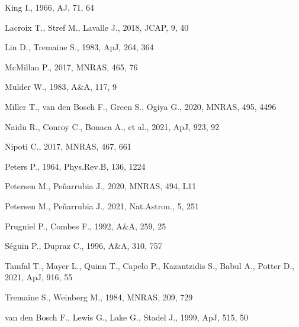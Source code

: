\documentclass[twocolumn]{aastex63}
\begin{document}
\begin{thebibliography}{}
King I., 1966, AJ, 71, 64

Lacroix T., Stref M., Lavalle J., 2018, JCAP, 9, 40

Lin D., Tremaine S., 1983, ApJ, 264, 364

McMillan P., 2017, MNRAS, 465, 76

Mulder W., 1983, A\&A, 117, 9

Miller T., van den Bosch F., Green S., Ogiya G., 2020, MNRAS, 495, 4496

Naidu R., Conroy C., Bonaca A., et al., 2021, ApJ, 923, 92

Nipoti C., 2017, MNRAS, 467, 661

Peters P., 1964, Phys.Rev.B, 136, 1224

Petersen M., Pe\~narrubia J., 2020, MNRAS, 494, L11

Petersen M., Pe\~narrubia J., 2021, Nat.Astron., 5, 251

Prugniel P., Combes F., 1992, A\&A, 259, 25

S\'eguin P., Dupraz C., 1996, A\&A, 310, 757

Tamfal T., Mayer L., Quinn T., Capelo P., Kazantzidis S., Babul A., Potter D., 2021, ApJ, 916, 55

Tremaine S., Weinberg M., 1984, MNRAS, 209, 729

van den Bosch F., Lewis G., Lake G., Stadel J., 1999, ApJ, 515, 50


\end{thebibliography}
\end{document}
